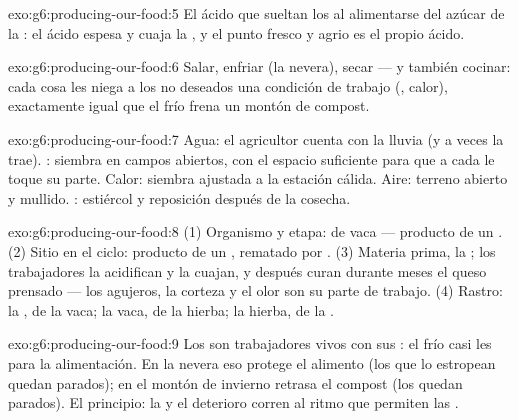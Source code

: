 \begin{solution}{exo:g6:producing-our-food:5}
El ácido que sueltan los  al alimentarse del azúcar de la
: el ácido espesa y cuaja la , y el punto fresco y agrio es
el propio ácido.
\end{solution}

\begin{solution}{exo:g6:producing-our-food:6}
Salar, enfriar (la nevera), secar --- y también cocinar: cada cosa les
niega a los  no deseados una condición de trabajo (,
calor), exactamente igual que el frío frena un montón de compost.
\end{solution}

\begin{solution}{exo:g6:producing-our-food:7}
Agua: el agricultor cuenta con la lluvia (y a veces la trae). :
siembra en campos abiertos, con el espacio suficiente para que a cada
 le toque su parte. Calor: siembra ajustada a la estación cálida.
Aire: terreno abierto y  mullido. : estiércol y
reposición después de la cosecha.
\end{solution}

\begin{solution}{exo:g6:producing-our-food:8}
(1) Organismo y etapa:  de vaca --- producto de un .
(2) Sitio en el ciclo: producto de un , rematado por
. (3) Materia prima, la ; los trabajadores la acidifican
y la cuajan, y después curan durante meses el queso prensado --- los
agujeros, la corteza y el olor son su parte de trabajo. (4) Rastro: la
, de la vaca; la vaca, de la hierba; la hierba, de la .
\end{solution}

\begin{solution}{exo:g6:producing-our-food:9}
Los  son trabajadores vivos con sus : el frío casi
les para la alimentación. En la nevera eso protege el alimento (los que
lo estropean quedan parados); en el montón de invierno retrasa el
compost (los  quedan parados). El principio: la
 y el deterioro corren al ritmo que permiten las
.
\end{solution}

